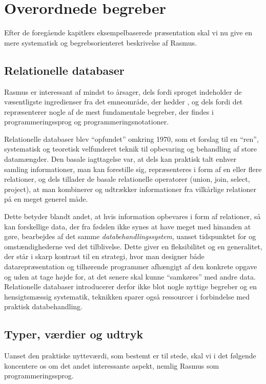 \documentclass{article}
\newcounter{eks}
\begin{document}
\newpage
\section{Overordnede begreber}
Efter de foreg\aa{}ende kapitlers eksempelbaserede pr\ae{}sentation
skal vi nu give en mere systematisk og begrebsorienteret beskrivelse af
{\sc Rasmus}.

\subsection{Relationelle databaser}
{\sc Rasmus} er interessant af mindst to \aa{}rsager, dels fordi
sproget indeholder de v\ae{}sentligste ingredienser fra det emneomr\aa{}de,
der hedder {\em {}}, og dels fordi det repr\ae{}senterer
nogle af de mest fundamentale begreber, der findes i programmeringssprog
og programmeringsnotationer.

Relationelle databaser blev ``opfundet'' omkring 1970, som et forslag
til en ``ren'', systematisk og teoretisk velfunderet teknik til
opbevaring og behandling af store datam\ae{}ngder. Den basale
iagttagelse var, at dels kan praktisk talt enhver samling informationer,
man kan forestille sig, repr\ae{}senteres i form af en eller flere
relationer, og dels tillader de basale relationelle operatorer
(union, join, select, project), at man kombinerer og udtr\ae{}kker
informationer fra vilk\aa{}rlige relationer p\aa{} en meget generel
m\aa{}de. 

Dette betyder blandt andet, at hvis information opbevares
i form af relationer, s\aa{} kan forskellige data, der fra f\o{}dslen
ikke synes at have meget med hinanden at g\o{}re, bearbejdes af det samme
{\em databehandlingssystem}, uanset tidspunktet for og omst\ae{}ndighederne
ved det tilblivelse. Dette giver en fleksibilitet og en generalitet,
der st\aa{}r i skarp kontrast til en strategi, hvor man designer b\aa{}de
datarepr\ae{}sentation og tilh\o{}rende programmer afh\ae{}ngigt af
den konkrete opgave og uden at tage h\o{}jde for, at det senere skal kunne
``samk\o{}res'' med andre data. Relationelle databaser introducerer derfor
ikke blot nogle nyttige begreber og en hensigtsm\ae{}ssig systematik,
teknikken sparer ogs\aa{} ressourcer i forbindelse med praktisk 
databehandling.

\subsection{Typer, v\ae{}rdier og udtryk}
Uanset den praktiske nyttev\ae{}rdi, som bestemt er til stede, skal vi
i det f\o{}lgende koncentere os om det andet interessante aspekt, nemlig
{\sc Rasmus} som programmeringssprog. 
\end{document}
